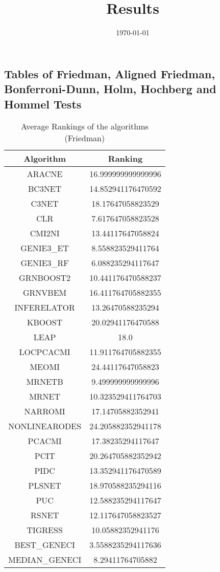 \documentclass[a4paper,10pt]{article}
\title{Results}
\author{}
\date{\today}
\begin{document}
\begin{landscape}
\oddsidemargin 0in \topmargin 0in\maketitle
\section{Tables of Friedman, Aligned Friedman, Bonferroni-Dunn, Holm, Hochberg and Hommel Tests}
\begin{table}[!htp]
\centering
\caption{Average Rankings of the algorithms (Friedman)
}\begin{tabular}{c|c}
Algorithm&Ranking\\
\hline
ARACNE&16.999999999999996\\
BC3NET&14.852941176470592\\
C3NET&18.17647058823529\\
CLR&7.617647058823528\\
CMI2NI&13.44117647058824\\
GENIE3_ET&8.558823529411764\\
GENIE3_RF&6.088235294117647\\
GRNBOOST2&10.441176470588237\\
GRNVBEM&16.411764705882355\\
INFERELATOR&13.26470588235294\\
KBOOST&20.02941176470588\\
LEAP&18.0\\
LOCPCACMI&11.911764705882355\\
MEOMI&24.44117647058823\\
MRNETB&9.499999999999996\\
MRNET&10.323529411764703\\
NARROMI&17.14705882352941\\
NONLINEARODES&24.205882352941178\\
PCACMI&17.38235294117647\\
PCIT&20.264705882352942\\
PIDC&13.352941176470589\\
PLSNET&18.970588235294116\\
PUC&12.588235294117647\\
RSNET&12.117647058823527\\
TIGRESS&10.05882352941176\\
BEST_GENECI&3.5588235294117636\\
MEDIAN_GENECI&8.29411764705882\\
\end{tabular}
\end{table}



\end{landscape}
\end{document}
